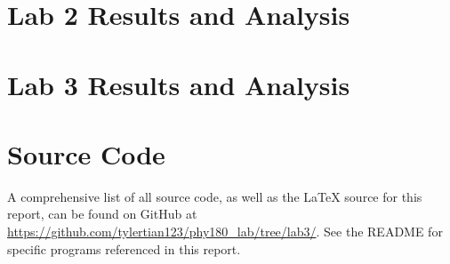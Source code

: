 \documentclass[aps,twocolumn,secnumarabic,nobalancelastpage,amsmath,amssymb,nofootinbib,floatfix,letterpaper]{revtex4}
\begin{document}

\section{Lab 2 Results and Analysis}


\section{Lab 3 Results and Analysis}


\appendix

\section{Source Code}

A comprehensive list of all source code, as well as the \LaTeX{} source for this report, can be found on GitHub at
\url{https://github.com/tylertian123/phy180_lab/tree/lab3/}. See the README for specific programs referenced in this
report.
\label{appendix:code}
\end{document}
